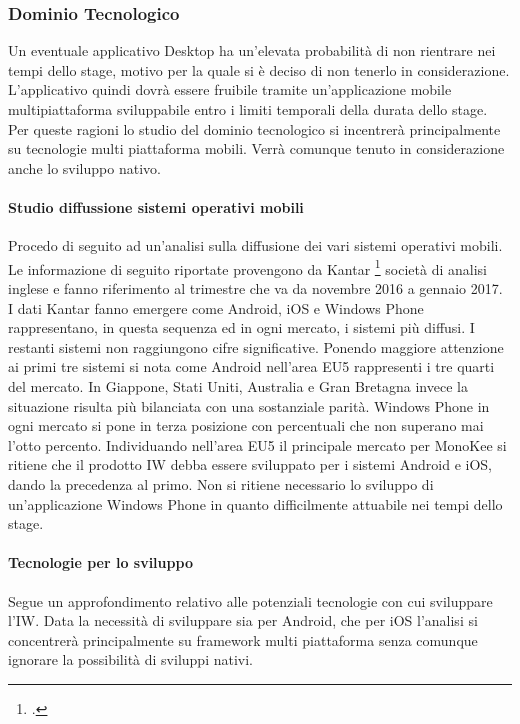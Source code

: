 \subsubsection{Dominio Tecnologico}
Un eventuale applicativo Desktop ha un’elevata probabilità di non rientrare nei tempi dello stage, motivo per la quale si è deciso di non tenerlo in considerazione. L’applicativo quindi dovrà essere fruibile tramite un’applicazione mobile multipiattaforma sviluppabile entro i limiti temporali della durata dello stage. 
Per queste ragioni lo studio del dominio tecnologico si incentrerà principalmente su tecnologie multi piattaforma mobili. Verrà comunque tenuto in considerazione anche lo sviluppo nativo.
\paragraph{Studio diffussione sistemi operativi mobili}
Procedo di seguito ad un’analisi sulla diffusione dei vari sistemi operativi mobili.
Le informazione di seguito riportate provengono da Kantar \footcite{site:kantar-study} società di analisi inglese e fanno riferimento al trimestre che va da novembre 2016 a gennaio 2017.
I dati Kantar fanno emergere come Android, iOS e Windows Phone rappresentano, in questa sequenza ed in ogni mercato, i sistemi più diffusi. I restanti sistemi non raggiungono cifre significative. Ponendo maggiore attenzione ai primi tre sistemi si nota come Android nell’area EU5 rappresenti i tre quarti del mercato. In Giappone, Stati Uniti, Australia e Gran Bretagna invece la situazione risulta più bilanciata con una sostanziale parità. Windows Phone in ogni mercato si pone in terza posizione con percentuali che non superano mai l’otto percento. Individuando nell’area EU5 il principale mercato per MonoKee si ritiene che il prodotto IW debba essere sviluppato per i sistemi Android e iOS, dando la precedenza al primo. Non si ritiene necessario lo sviluppo di un’applicazione Windows Phone in quanto difficilmente attuabile nei tempi dello stage. 
\paragraph{Tecnologie per lo sviluppo}
Segue un approfondimento relativo alle potenziali tecnologie con cui sviluppare l’IW. Data la necessità di sviluppare sia per Android, che per iOS l’analisi si concentrerà principalmente su framework multi piattaforma senza comunque ignorare la possibilità di sviluppi nativi.
